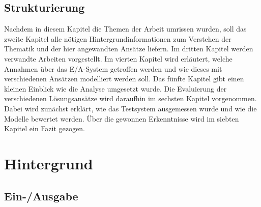\documentclass[
	12pt,
	a4paper,
	BCOR10mm,
	DIV14,
	listof=totoc,
	bibliography=totoc,
	headsepline
]{scrreprt}
\begin{document}
\section{Strukturierung}
Nachdem in diesem Kapitel die Themen der Arbeit umrissen wurden, soll das zweite Kapitel alle nötigen Hintergrundinformationen zum Verstehen der Thematik und der hier angewandten Ansätze liefern. Im dritten Kapitel werden verwandte Arbeiten vorgestellt.
Im vierten Kapitel wird erläutert, welche Annahmen über das E/A-System getroffen werden und wie dieses mit verschiedenen Ansätzen modelliert werden soll.
Das fünfte Kapitel gibt einen kleinen Einblick wie die Analyse umgesetzt wurde.
Die Evaluierung der verschiedenen Lösungsansätze wird daraufhin im sechsten Kapitel vorgenommen. Dabei wird zunächst erklärt, wie das Testsystem ausgemessen wurde und wie die Modelle bewertet werden.
Über die gewonnen Erkenntnisse wird im siebten Kapitel ein Fazit gezogen.

\chapter{Hintergrund}
\label{Hintergrund}

\section{Ein-/Ausgabe}
\label{E/A}
\end{document}
